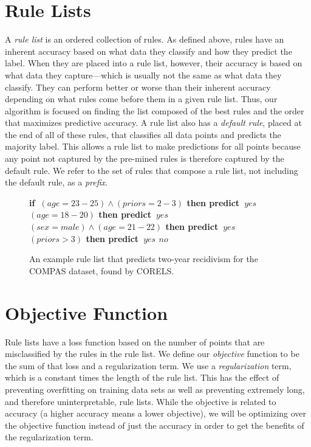 \documentclass[]{report}
\theoremstyle{definition}
\def\bif{\bf if~}
\def\belif{{\bf else if~}}
\def\bthen{{\bf then predict~}}
\def\belse{{\bf else predict~}}
\begin{document}
\section{Rule Lists}
A \textit{rule list} is an ordered collection of rules.
As defined above, rules have an inherent accuracy based on what data they classify and how they predict the label.
When they are placed into a rule list, however, their accuracy is based on what data they capture---which is usually not the same as what data they classify.
They can perform better or worse than their inherent accuracy depending on what rules come before them in a given rule list.
Thus, our algorithm is focused on finding the list composed of the best rules and the order that maximizes predictive accuracy.
A rule list also has a \textit{default rule}, placed at the end of all of these rules, that classifies all data points and predicts the majority label.
This allows a rule list to make predictions for all points because any point not captured by the pre-mined rules is therefore captured by the default rule.
We refer to the set of rules that compose a rule list, not including the default rule, as a \textit{prefix}.

\begin{figure}[t!]
\begin{algorithmic}
\normalsize
\State \bif $(age=23-25) \wedge (priors=2-3)$ \bthen $yes$
\State \belif $(age=18-20)$ \bthen $yes$
\State \belif $(sex=male) \wedge (age=21-22)$ \bthen $yes$
\State \belif $(priors>3)$ \bthen $yes$
\State \belse $no$
\end{algorithmic}
\caption{An example rule list that predicts two-year recidivism for the COMPAS dataset, found by CORELS.}
\label{fig:rule-list}
\end{figure}

\section{Objective Function}
Rule lists have a loss function based on the number of points that are misclassified by the rules in the rule list.
We define our \textit{objective} function to be the sum of that loss and a regularization term.
We use a \textit{regularization} term, which is a constant times the length of the rule list.
This has the effect of preventing overfitting on training data sets as well as preventing extremely long, and therefore uninterpretable, rule lists.
While the objective is related to accuracy (a higher accuracy means a lower objective), we will be optimizing over the objective function instead of just the accuracy in order to get the benefits of the regularization term.
\end{document}
